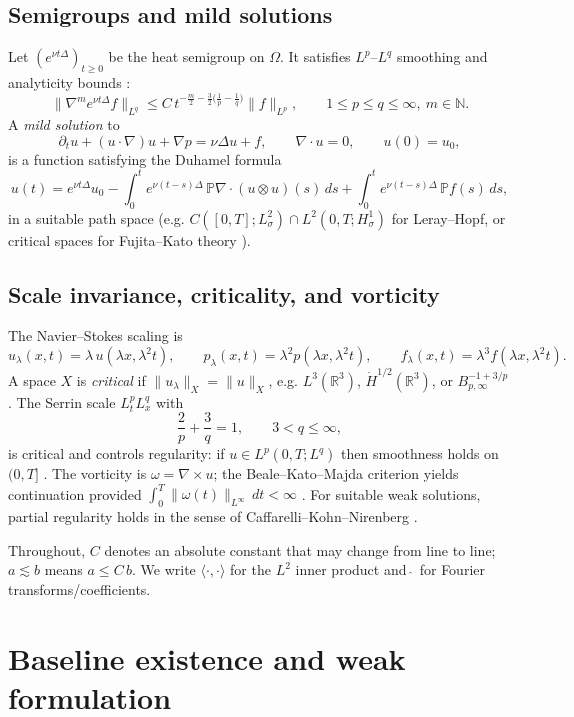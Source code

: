 \IfFileExists{nyjm.cls}{\documentclass[11pt]{nyjm}}{\documentclass[11pt]{amsart}}
\newcommand{\R}{\mathbb{R}}
\theoremstyle{plain}
\theoremstyle{definition}
\theoremstyle{remark}
\begin{document}
\subsection{Semigroups and mild solutions}\label{subsec:semigroup}
Let $(e^{\nu t\Delta})_{t\ge0}$ be the heat semigroup on $\Omega$.
It satisfies $L^p$–$L^q$ smoothing and analyticity bounds \cite{Stein1970,Temam2001}:
\[
  \|\nabla^m e^{\nu t\Delta}f\|_{L^q}
  \le C\, t^{-\frac{m}{2}-\frac{3}{2}\big(\frac{1}{p}-\frac{1}{q}\big)} \|f\|_{L^p},
  \qquad 1\le p\le q\le\infty,\ m\in\mathbb N.
\]
A \emph{mild solution} to
\[
  \partial_t u+(u\cdot\nabla)u+\nabla p=\nu\Delta u+f,\qquad \nabla\!\cdot u=0,\qquad u(0)=u_0,
\]
is a function satisfying the Duhamel formula
\[
  u(t)=e^{\nu t\Delta}u_0
  -\int_0^t e^{\nu(t-s)\Delta}\,\mathbb P\nabla\!\cdot(u\otimes u)(s)\,ds
  +\int_0^t e^{\nu(t-s)\Delta}\,\mathbb P f(s)\,ds,
\]
in a suitable path space (e.g. $C([0,T];L^2_\sigma)\cap L^2(0,T;H^1_\sigma)$ for Leray–Hopf, or critical spaces for Fujita–Kato theory \cite{FujitaKato1964,Temam2001,Lemarie2002}).

\subsection{Scale invariance, criticality, and vorticity}\label{subsec:scale}
The Navier–Stokes scaling is
\[
  u_\lambda(x,t)=\lambda\,u(\lambda x,\lambda^2 t),\qquad
  p_\lambda(x,t)=\lambda^2 p(\lambda x,\lambda^2 t),\qquad
  f_\lambda(x,t)=\lambda^3 f(\lambda x,\lambda^2 t).
\]
A space $X$ is \emph{critical} if $\|u_\lambda\|_X=\|u\|_X$, e.g.
$L^3(\R^3)$, $\dot H^{1/2}(\R^3)$, or $B^{-1+3/p}_{p,\infty}$.
The Serrin scale $L^p_tL^q_x$ with
\[
  \frac{2}{p}+\frac{3}{q}=1,\qquad 3<q\le\infty,
\]
is critical and controls regularity: if $u\in L^p(0,T;L^q)$ then smoothness holds on $(0,T]$ \cite{Serrin1962,Temam2001}.
The vorticity is $\omega=\nabla\times u$; the Beale--Kato--Majda criterion yields continuation provided
$\int_0^T \|\omega(t)\|_{L^\infty}\,dt<\infty$ \cite{BealeKatoMajda1984}.
For suitable weak solutions, partial regularity holds in the sense of Caffarelli--Kohn--Nirenberg \cite{CKN1982}.

\medskip
Throughout, $C$ denotes an absolute constant that may change from line to line; $a\lesssim b$ means $a\le C\,b$.
We write $\langle\cdot,\cdot\rangle$ for the $L^2$ inner product and $\widehat{\;}$ for Fourier transforms/coefficients.


\section{Baseline existence and weak formulation}\label{sec:leray-hopf}
\end{document}
